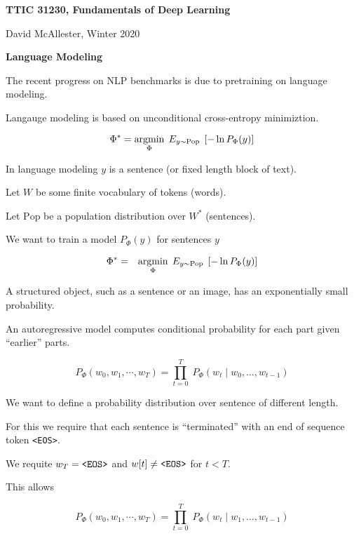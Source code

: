 




{\Huge

  \centerline{\bf TTIC 31230, Fundamentals of Deep Learning}
  \bigskip
  \centerline{David McAllester, Winter 2020}
  \vfill
  \centerline{\bf Language Modeling}


The recent progress on NLP benchmarks is due to pretraining on language modeling.

\vfill
Langauge modeling is based on unconditional cross-entropy minimiztion.

\vfill
$$\Phi^* = \operatorname*{argmin}_\Phi \;E_{y \sim \mathrm{Pop}}\;\left[-\ln P_\Phi(y)\right]$$

\vfill
In language modeling $y$ is a sentence (or fixed length block of text).


Let $W$ be some finite vocabulary of tokens (words).

\vfill
Let $\mathrm{Pop}$ be a population distribution over $W^*$ (sentences).

\vfill
We want to train a model $P_\Phi(y)$ for sentences $y$

\begin{eqnarray*}
\Phi^* & = & \operatorname*{argmin}_\Phi \; E_{y \sim \mathrm{Pop}}\;\left[-\ln P_\Phi(y)\right]
\end{eqnarray*}


A structured object, such as a sentence or an image, has an exponentially small probability.

\vfill
An autoregressive model computes conditional probability for each part given ``earlier'' parts.

\vfill
$$P_\Phi(w_0, w_1, \cdots, w_T) = \prod_{t=0}^T\;P_\Phi(w_t\;|\;w_0,\ldots,w_{t-1})$$



We want to define a probability distribution over sentence of different length.

\vfill
For this we require that each sentence is ``terminated'' with an end of sequence token {\tt <EOS>}.

\vfill
We requite $w_T = \mbox{\tt <EOS>}$ and $w[t] \not = \mbox{\tt <EOS>}$ for $t < T$.

\vfill
This allows

$$P_\Phi(w_0, w_1, \cdots, w_T) = \prod_{t=0}^T\;P_\Phi(w_t\;|\;w_1,\ldots,w_{t-1})$$

}
